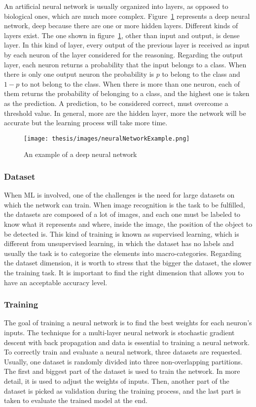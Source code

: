 \documentclass[../thesis.tex]{subfiles}
\begin{document}
An artificial neural network is usually organized into layers, as opposed to biological ones, which are much more complex.  Figure~\ref{fig:neural_network_example} represents a deep neural network, deep because there are one or more hidden layers. Different kinds of layers exist. The one shown in figure~\ref{fig:neural_network_example}, other than input and output, is dense layer. In this kind of layer, every output of the previous layer is received as input by each neuron of the layer considered for the reasoning. Regarding the output layer, each neuron returns a probability that the input belongs to a class. When there is only one output neuron the probability is $p$ to belong to the class and $1-p$ to not belong to the class. When there is more than one neuron, each of them returns the probability of belonging to a class, and the highest one is taken as the prediction. A prediction, to be considered correct, must overcome a threshold value. In general, more are the hidden layer, more the network will be accurate but the learning process will take more time. 

\begin{figure}[H]
    \centering
    \texttt{[image: thesis/images/neuralNetworkExample.png]}
    \caption{An example of a deep neural network}
    \label{fig:neural_network_example}
\end{figure}

\subsubsection{Dataset}
When \acrshort{ML} is involved, one of the challenges is the need for large datasets on which the network can train. When image recognition is the task to be fulfilled, the datasets are composed of a lot of images, and each one must be labeled to know what it represents and where, inside the image, the position of the object to be detected is. This kind of training is known as supervised learning, which is different from unsupervised learning, in which the dataset has no labels and usually the task is to categorize the elements into macro-categories. Regarding the dataset dimension, it is worth to stress that the bigger the dataset, the slower the training task. It is important to find the right dimension that allows you to have an acceptable accuracy level. 

\subsubsection{Training}
The goal of training a neural network is to find the best weights for each neuron’s inputs. The technique for a multi-layer neural network is stochastic gradient descent with back propagation and data is essential to training a neural network. To correctly train and evaluate a neural network, three datasets are requested. Usually, one dataset is randomly divided into three non-overlapping partitions. The first and biggest part of the dataset is used to train the network. In more detail, it is used to adjust the weights of inputs. Then, another part of the dataset is picked as validation during the training process, and the last part is taken to evaluate the trained model at the end.
\end{document}
